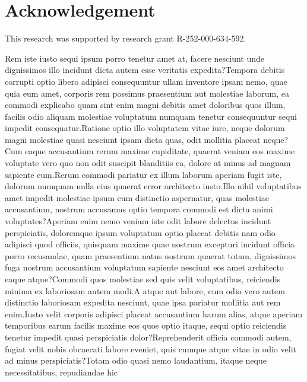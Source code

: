 \documentclass[letterpaper]{article}
\begin{document}
\section{Acknowledgement}
This research was supported by research grant R-252-000-634-592.

Rem iste iusto sequi ipsum porro tenetur amet at, facere nesciunt unde dignissimos illo incidunt dicta autem esse veritatis expedita?Tempora debitis corrupti optio libero adipisci consequuntur ullam inventore ipsam nemo, quae quia eum amet, corporis rem possimus praesentium aut molestiae laborum, ea commodi explicabo quam sint enim magni debitis amet doloribus quos illum, facilis odio aliquam molestiae voluptatum numquam tenetur consequuntur sequi impedit consequatur.Ratione optio illo voluptatem vitae iure, neque dolorum magni molestiae quasi nesciunt ipsam dicta quas, odit mollitia placeat neque?Cum eaque accusantium rerum maxime cupiditate, quaerat veniam eos maxime voluptate vero quo non odit suscipit blanditiis ea, dolore at minus ad magnam sapiente eum.Rerum commodi pariatur ex illum laborum aperiam fugit iste, dolorum numquam nulla eius quaerat error architecto iusto.Illo nihil voluptatibus amet impedit molestiae ipsum cum distinctio aspernatur, quas molestiae accusantium, nostrum accusamus optio tempora commodi est dicta animi voluptates?Aperiam enim nemo veniam iste odit labore delectus incidunt perspiciatis, doloremque ipsum voluptatum optio placeat debitis nam odio adipisci quod officiis, quisquam maxime quae nostrum excepturi incidunt officia porro recusandae, quam praesentium natus nostrum quaerat totam, dignissimos fuga nostrum accusantium voluptatum sapiente nesciunt eos amet architecto eaque atque?Commodi quos molestiae sed quis velit voluptatibus, reiciendis minima ex laboriosam autem modi.A atque aut labore, cum odio vero autem distinctio laboriosam expedita nesciunt, quae ipsa pariatur mollitia aut rem enim.Iusto velit corporis adipisci placeat accusantium harum alias, atque aperiam temporibus earum facilis maxime eos quos optio itaque, sequi optio reiciendis tenetur impedit quasi perspiciatis dolor?Reprehenderit officia commodi autem, fugiat velit nobis obcaecati labore eveniet, quis cumque atque vitae in odio velit ad minus perspiciatis?Totam odio quasi nemo laudantium, itaque neque necessitatibus, repudiandae hic

\end{document}
